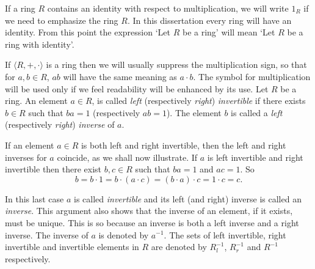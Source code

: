 \documentclass[12pt, oneside]{book}
\begin{document}
\noindent If a ring $R$ contains an identity with respect to multiplication, we will write $1_R$ 
if we need to emphasize the ring $R$. In this dissertation every ring will have an identity. 
From this point the expression `Let $R$ be a ring' will mean `Let $R$ be a ring with identity'. 

\vskip 0.3cm
\noindent If $\langle R, +, \cdot \rangle$ is a ring then we will usually suppress the 
multiplication sign, so that for $a, b \in R$, $ab$ will have the same meaning as $a \cdot b$. 
The symbol for multiplication will be used only if we feel readability will be enhanced by its use.
\vskip 0.3cm
\noindent Let $R$ be a ring. An element $a \in R$, is called {\sl left} 
(respectively {\sl right}) {\sl invertible} if there exists $b \in R$ such that $ba = 1$ 
(respectively $ab = 1$). The element $b$ is called a {\sl left} (respectively {\sl right}) {\sl inverse}
 of $a$.

\vskip 0.3cm

\noindent If an element $a \in R$  is both left and right invertible, then the left and right inverses for $a$ coincide, as we shall now illustrate. If $a$ is left invertible and right invertible then there exist $b, c \in R$ such that $ba = 1$ and $ac = 1$. So
\begin{equation} \label{InversesAreUnique}
b = b \cdot 1 = b \cdot (a \cdot c) = (b \cdot a) \cdot c = 1 \cdot c = c.
\end{equation}

\noindent In this last case  $a$ is called {\sl invertible} and its left (and right) inverse is called an {\sl inverse}. This argument also shows that the inverse of an element, if it exists, must be unique. This is so because an inverse is both a left inverse and a right inverse. 
The inverse of $a$ is denoted by $a^{-1}$. The sets of left invertible, right  invertible and invertible elements in $R$ are denoted by $R^{-1}_l$, $R^{-1}_r$ and $R^{-1}$ respectively.
\end{document}
